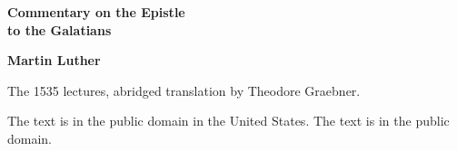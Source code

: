 \documentclass[11pt,letterpaper]{article}
\begin{document}
\color{ink}

\begin{titlepage}
\centering
\vspace*{4em}
{\LARGE\bfseries\color{heading} Commentary on the Epistle\\[0.3em]to the Galatians\par}
\vspace{2em}
{\Large\bfseries\color{heading} Martin Luther\par}
\vspace{2.5em}
{\itshape\color{subhead}\parbox{0.8\linewidth}{\centering The 1535 lectures, abridged translation by Theodore Graebner.\par}}
\vfill
{\small The text is in the public domain in the United States. The text is in the public domain.\par}
\vspace{2em}
\end{titlepage}

\tableofcontents


\end{document}

